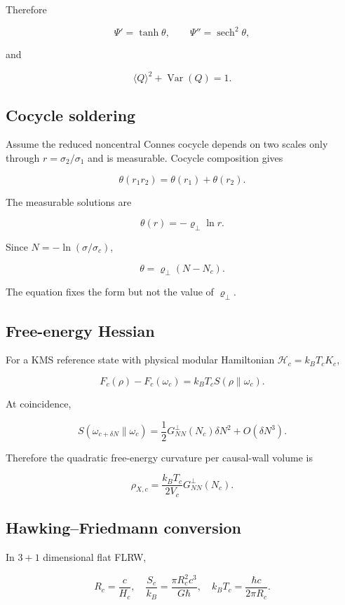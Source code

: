 \documentclass[
  11pt,
  letterpaper,
]{article}
\begin{document}
Therefore

\[
\Psi'=\tanh\theta,
\qquad
\Psi''=\operatorname{sech}^2\theta,
\]

and

\[
\langle Q\rangle^2+\operatorname{Var}(Q)=1.
\]

\subsection{Cocycle soldering}\label{cocycle-soldering}

Assume the reduced noncentral Connes cocycle depends on two scales only
through \(r=\sigma_2/\sigma_1\) and is measurable. Cocycle composition
gives

\[
\theta(r_1r_2)=\theta(r_1)+\theta(r_2).
\]

The measurable solutions are

\[
\theta(r)=-\varrho_\perp\ln r.
\]

Since \(N=-\ln(\sigma/\sigma_c)\),

\[
\theta=\varrho_\perp(N-N_c).
\]

The equation fixes the form but not the value of \(\varrho_\perp\).

\subsection{Free-energy Hessian}\label{free-energy-hessian}

For a KMS reference state with physical modular Hamiltonian
\(\mathcal H_c=k_BT_cK_c\),

\[
F_c(\rho)-F_c(\omega_c)=k_BT_cS(\rho\|\omega_c).
\]

At coincidence,

\[
S(\omega_{c+\delta N}\|\omega_c)
=\frac12G^{\perp}_{NN}(N_c)\delta N^2+O(\delta N^3).
\]

Therefore the quadratic free-energy curvature per causal-wall volume is

\[
\rho_{X,c}=\frac{k_BT_c}{2V_c}G^{\perp}_{NN}(N_c).
\]

\subsection{Hawking--Friedmann
conversion}\label{hawkingfriedmann-conversion-1}

In \(3+1\) dimensional flat FLRW,

\[
R_c=\frac{c}{H_c},
\quad
\frac{S_c}{k_B}=\frac{\pi R_c^2c^3}{G\hbar},
\quad
k_BT_c=\frac{\hbar c}{2\pi R_c}.
\]
\end{document}
